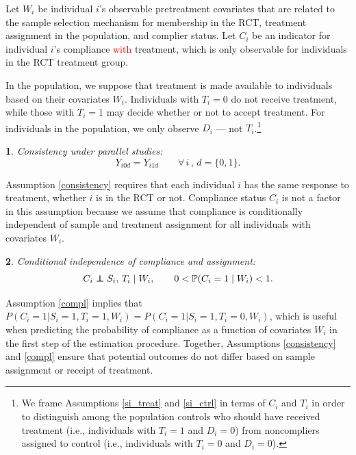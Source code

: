 \documentclass[hidelinks,12pt]{article}
\makeatletter
\newtheorem*{assumption*}{\assumptionnumber}
\providecommand{\assumptionnumber}{}
\newenvironment{assumption}[2]
 {%
  \renewcommand{\assumptionnumber}{Assumption #1}%
  \begin{assumption*}%
  \protected@edef\@currentlabel{#1}%
 }
 {%
  \end{assumption*}
 }
\newcommand{\pr}{\mathbb{P}} %
\newcommand\independent{\protect\mathpalette{\protect\independenT}{\perp}}
\def\independenT#1#2{\mathrel{\rlap{$#1#2$}\mkern2mu{#1#2}}}
\makeatother
\begin{document}
Let $W_i$ be individual $i$'s observable pretreatment covariates that are related to the sample selection mechanism for membership in the RCT, treatment assignment in the population, and complier status. Let $C_i$ be an indicator for individual $i$'s compliance \textcolor{red}{with} treatment, which is only observable for individuals in the RCT treatment group. 

In the population, we suppose that treatment is made available to individuals based on their covariates $W_i$. Individuals with $T_i = 0$ do not receive treatment, while those with $T_i=1$ may decide whether or not to accept treatment. For individuals in the population, we only observe $D_i$ --- not $T_i$.\footnote{We frame Assumptions \eqref{si_treat} and \eqref{si_ctrl} in terms of $C_i$ and $T_i$ in order to distinguish among the population controls who should have received treatment (i.e., individuals with $T_i = 1$ and $D_i = 0$) from noncompliers assigned to control (i.e., individuals with $T_i = 0$ and $D_i = 0$).}

\vskip 0.2in
\begin{assumption}{1}{}\label{consistency}
	Consistency under parallel studies:
	\begin{equation*}
	Y_{i0d} = Y_{i1d} \qquad \forall \, i \, , \, d=\{0,1\}.
	\end{equation*}
\end{assumption} 

\noindent Assumption \eqref{consistency} requires that each individual $i$ has the same response to treatment, whether $i$ is in the RCT or not. Compliance status $C_i$ is not a factor in this assumption because we assume that compliance is conditionally independent of sample and treatment assignment for all individuals with covariates $W_i$.
	
\vskip 0.2in
\begin{assumption}{2}{}\label{compl}
	Conditional independence of compliance and assignment:
	\begin{equation*}
	C_i \independent S_i,\,T_i \mid W_i, \qquad 0 < \pr(C_i = 1 \mid W_i) < 1. 
	\end{equation*}
\end{assumption}

\noindent Assumption \eqref{compl} implies that $P(C_i=1 | S_i=1, T_i=1, W_i) = P(C_i=1 | S_i=1, T_i=0, W_i)$, which is useful when predicting the probability of compliance as a function of covariates $W_i$ in the first step of the estimation procedure. Together, Assumptions \eqref{consistency} and \eqref{compl} ensure that potential outcomes do not differ based on sample assignment or receipt of treatment.
\end{document}
